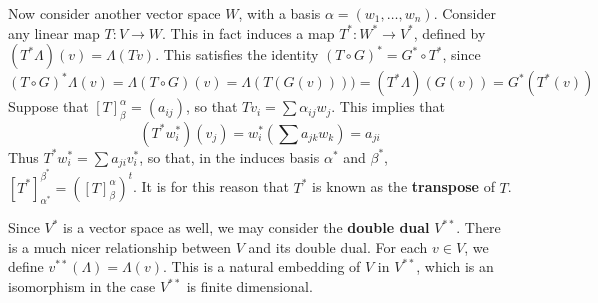 Now consider another vector space $W$, with a basis $\alpha = (w_1, \dots, w_n)$. Consider any linear map $T:V \to W$. This in fact induces a map $T^*:W^* \to V^*$, defined by $(T^*\Lambda)(v) = \Lambda(Tv)$. This satisfies the identity $(T \circ G)^* = G^* \circ T^*$, since
%
\[ (T \circ G)^*\Lambda(v) = \Lambda(T \circ G)(v) = \Lambda(T(G(v)))) = (T^*\Lambda)(G(v)) = G^*(T^*(v)) \]
%
Suppose that $[T]_\beta^\alpha = (a_{ij})$, so that $Tv_i = \sum \alpha_{ij} w_j$. This implies that
%
\[ (T^*w_i^*)(v_j) = w_i^*(\sum a_{jk} w_k) = a_{ji} \]
%
Thus $T^*w_i^* = \sum a_{ji} v_i^*$, so that, in the induces basis $\alpha^*$ and $\beta^*$, $[T^*]_{\alpha^*}^{\beta^*} = ([T]_\beta^\alpha)^t$. It is for this reason that $T^*$ is known as the {\bf transpose} of $T$.

Since $V^*$ is a vector space as well, we may consider the {\bf double dual} $V^{**}$. There is a much nicer relationship between $V$ and its double dual. For each $v \in V$, we define $v^{**}(\Lambda) = \Lambda(v)$. This is a natural embedding of $V$ in $V^{**}$, which is an isomorphism in the case $V^{**}$ is finite dimensional.





